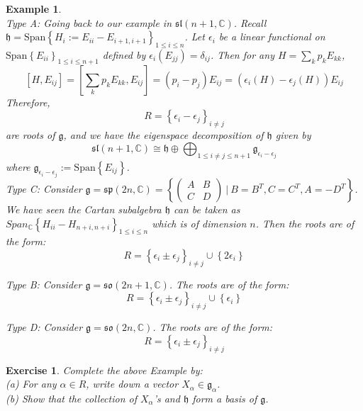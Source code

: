 \documentclass[11pt]{article}
\newtheorem{example}[theorem]{Example}
\newtheorem{exercise}[theorem]{Exercise}
\newcommand{\bb}[1]{\mathbb{#1}}
\newcommand{\mf}[1]{\mathfrak{#1}}
\begin{document}
\begin{example} \mbox{}\\
Type A: Going back to our example in $\mf{sl}(n+1,\bb{C})$. Recall $\mf{h} = \mathrm{Span}\left\{H_i := E_{ii} - E_{i+1,i+1}\right\}_{1\leq i \leq n}$. Let $\epsilon_{i}$ be a linear functional on $\mathrm{Span}\left\{E_{ii}\right\}_{1 \leq i \leq n+1}$ defined by $\epsilon_i(E_{jj}) = \delta_{ij}$. Then for any $H = \sum_k p_kE_{kk}$,
$$[H,E_{ij}] = [\sum_k p_kE_{kk}, E_{ij}] = (p_i - p_j)E_{ij} = (\epsilon_i(H) - \epsilon_j(H))E_{ij}$$
Therefore,
$$R = \left\{ \epsilon_i - \epsilon_j \right\}_{i \neq j}$$
are roots of $\mf{g}$, and we have the eigenspace decomposition of $\mf{h}$ given by
$$\mf{sl}(n+1,\bb{C}) \cong \mf{h} \oplus \bigoplus_{1\leq i \neq j \leq n+1} \mf{g}_{\epsilon_i - \epsilon_j}$$
where $\mf{g}_{\epsilon_i - \epsilon_j} := \mathrm{Span}\left\{E_{ij}\right\}$.\\

\noindent Type C: Consider $\mf{g} = \mf{sp}(2n,\bb{C}) = \left\{ \left( \begin{array}{cc}
A & B \\
C & D \end{array} \right)\ \Big|\ B = B^T, C = C^T, A = -D^T \right\}$. We have seen the Cartan subalgebra $\mf{h}$ can be taken as $Span_{\bb{C}}\left\{H_{ii} - H_{n+i, n+i}\right\}_{1 \leq i \leq n}$ which is of dimension $n$. Then the roots are of the form:
$$R = \left\{ \epsilon_i \pm \epsilon_j \right\}_{i \neq j} \cup \left\{2\epsilon_i\right\}$$

\noindent Type B: Consider $\mf{g} = \mf{so}(2n+1,\bb{C})$. The roots are of the form:
$$R = \left\{ \epsilon_i \pm \epsilon_j \right\}_{i \neq j} \cup \left\{\epsilon_i\right\}$$

\noindent Type D: Consider $\mf{g} = \mf{so}(2n,\bb{C})$. The roots are of the form:
$$R = \left\{ \epsilon_i \pm \epsilon_j \right\}_{i \neq j}$$
\end{example}

\begin{exercise}
Complete the above Example by:\\
(a) For any $\alpha \in R$, write down a vector $X_{\alpha} \in \mf{g}_{\alpha}$.\\
(b) Show that the collection of $X_{\alpha}$'s and $\mf{h}$ form a basis of $\mf{g}$.
\end{exercise}
\end{document}

